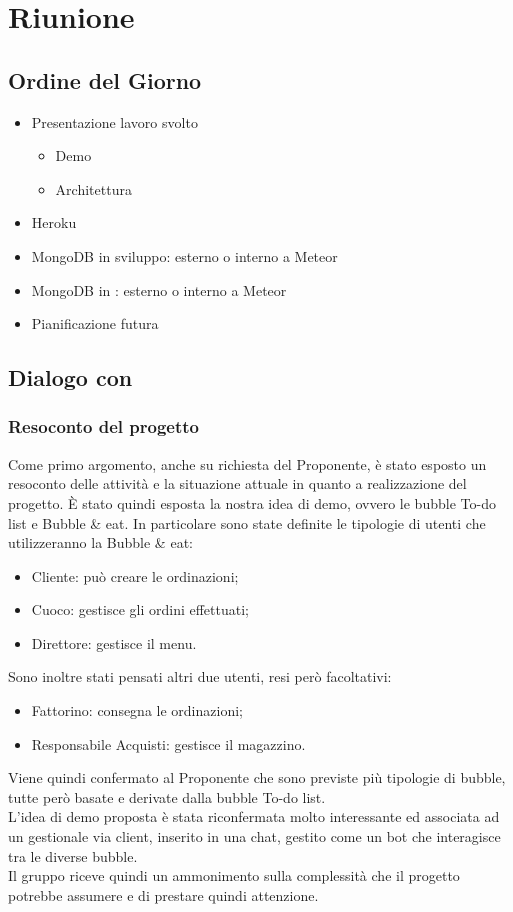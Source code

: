 \section{Riunione}
\subsection{Ordine del Giorno}
\begin{itemize}
	\item Presentazione lavoro svolto
	\begin{itemize}
		\item Demo
		\item Architettura
	\end{itemize}
	\item Heroku
	\item MongoDB in sviluppo: esterno o interno a Meteor
	\item MongoDB in : esterno o interno a Meteor
	\item Pianificazione futura
\end{itemize}

\subsection{Dialogo con \Proponente}
\subsubsection{Resoconto del progetto}
Come primo argomento, anche su richiesta del Proponente, è stato esposto un resoconto delle attività e la situazione attuale in quanto a realizzazione del progetto. È stato quindi esposta la nostra idea di demo, ovvero le bubble To-do list e Bubble \& eat. In particolare sono state definite le tipologie di utenti che utilizzeranno la Bubble \& eat:
\begin{itemize}
	\item Cliente: può creare le ordinazioni;
	\item Cuoco: gestisce gli ordini effettuati;
	\item Direttore: gestisce il menu.
\end{itemize}
Sono inoltre stati pensati altri due utenti, resi però facoltativi:
\begin{itemize}
	\item Fattorino: consegna le ordinazioni;
	\item Responsabile Acquisti: gestisce il magazzino.
\end{itemize}
Viene quindi confermato al Proponente che sono previste più tipologie di bubble, tutte però basate e derivate dalla bubble To-do list.\\
L'idea di demo proposta è stata riconfermata molto interessante ed associata ad un gestionale via client, inserito in una chat, gestito come un bot che interagisce tra le diverse bubble.\\
Il gruppo riceve quindi un ammonimento sulla complessità che il progetto potrebbe assumere e di prestare quindi attenzione.

